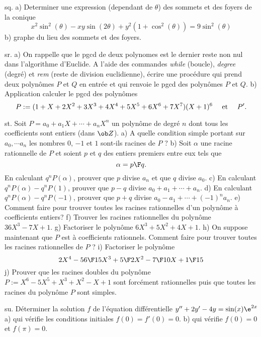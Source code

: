 \exo  [Level=1,Fight=0,Learn=0,Field=\Coniques,Type=\Exercices,Origin=] sq. 
a) Determiner une expression (dependant de $\theta$) des sommets et des foyers de la conique 
$$
x^2\sin^2(\theta)-xy\sin(2\theta)+y^2(1+\cos^2(\theta))=9\sin^2(\theta)
$$
b) graphe du lieu des sommets et des foyers. 


\exo [Level=1,Fight=2,Learn=1,Field=\Polynômes,Type=\Maple,Origin=] sr. 
a) On rappelle que le pgcd de deux polynomes est le dernier reste non nul dans l'algorithme d'Euclide. 
A l'aide des commandes {\it while} (boucle), {\it degree} (degré) et {\it rem} (reste de division euclidienne), 
écrire une procédure qui prend deux polynômes $P$ et $Q$ en entrée 
et qui renvoie le pgcd des polynômes $P$ et $Q$. \pn
b) Application calculer le pgcd des polynômes 
$$
P:=(1+X+2X^2+3X^3+4X^4+5X^5+6X^6+7X^7)(X+1)^6\quad\hbox{ et }\quad P'.
$$ 


\exo [Level=1,Fight=3,Learn=3,Field=\Polynômes,Type=\Cours,Origin=] st. 
Soit $P=a_0+a_1X+\cdots+a_nX^n$ un polynôme de degré $n$ dont tous les coefficients sont entiers (dans $\ob Z$). \pn
a) A quelle condition simple portant sur $a_0, \cdots a_n$ les nombres $0$, $-1$ et $1$ sont-ils racines de $P$ ? \pn
b) Soit $\alpha$ une racine rationnelle de $P$ et soient $p$ et $q$ des entiers premiers entre eux tels que 
$$
\alpha={p\F q}.
$$ 
En calculant $q^nP(\alpha)$, prouver que $p$ divise $a_n$ et que $q$ divise $a_0$. \pn
c) En calculant $q^nP(\alpha)-q^n P(1)$, prouver que $p-q$ divise $a_0+a_1+\cdots+a_n$. \pn
d) En calculant $q^nP(\alpha)-q^n P(-1)$, prouver que $p+q$ divise $a_0-a_1+\cdots+(-1)^na_n$. \pn
e) Comment faire pour trouver toutes les racines rationnelles d'un polynôme à coefficients entiers? \pn
f) Trouver les racines rationnelles du polynôme $36X^3-7X+1$. \pn
g) Factoriser le polynôme $6X^3+5X^2+4X+1$. \pn
h) On suppose maintenant que $P$ est à coefficients rationnels. 
Comment faire pour trouver toutes les racines rationnelles de $P$ ? \pn
i) Factoriser le polynôme 
$$
2X^4-{56\F 15}X^3+{5\F2}X^2-{7\F 10}X+{1\F 15}
$$
j) Prouver que les racines doubles du polynôme $P:=X^6-5X^5+X^3+X^2-X+1$ sont forcément rationnelles 
puis que toutes les racines du polynôme $P$ sont simples. 

\exo [Level=2,Fight=1,Learn=1,Field=\EquationsDifférentiellesLinéairesDuSecondOrdre,Type=\Exercices,Origin=] su. 
Déterminer la solution $f$ de l'équation différentielle $y''+2y'-4y=\sin(x)\e^{2x}$\pn
a) qui vérifie les conditions initiales $f(0)=f'(0)=0$. \pn
b) qui vérifie $f(0)=0$ et $f(\pi)=0$. 

